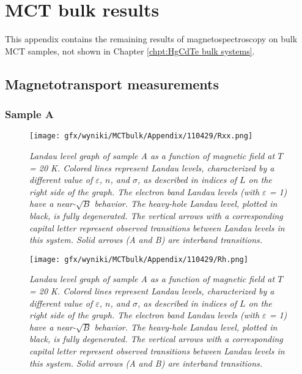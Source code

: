 \documentclass[titlepage,a4paper]{book}
\newcommand{\wciecie}{\quad\phantom{v}}
\begin{document}

\chapter{MCT bulk results}
\label{Appendix_bulk}
\wciecie
This appendix contains the remaining results of magnetospectroscopy on bulk MCT samples, not shown in Chapter \ref{chpt:HgCdTe bulk systems}.

\section{Magnetotransport measurements}
\subsection{Sample A}
\begin{figure}[ht]
	\centering
	\texttt{[image: gfx/wyniki/MCTbulk/Appendix/110429/Rxx.png]}
	\vspace{-10pt}
	\caption{\textit{Landau level graph of sample A as a function of magnetic field at $T$ = 20 K. Colored lines represent Landau levels, characterized by a different value of $\varepsilon$, $n$, and $\sigma$, as described in indices of $L$ on the right side of the graph. The electron band Landau levels (with $\varepsilon$ = 1) have a near-$\sqrt{B}$ behavior. The heavy-hole Landau level, plotted in black, is fully degenerated. The vertical arrows with a corresponding capital letter represent observed transitions between Landau levels in this system. Solid arrows (A and B) are interband transitions.}}
	\label{fig:110429_Rxx}
\end{figure}
\begin{figure}[ht]
	\centering
	\texttt{[image: gfx/wyniki/MCTbulk/Appendix/110429/Rh.png]}
	\vspace{-10pt}
	\caption{\textit{Landau level graph of sample A as a function of magnetic field at $T$ = 20 K. Colored lines represent Landau levels, characterized by a different value of $\varepsilon$, $n$, and $\sigma$, as described in indices of $L$ on the right side of the graph. The electron band Landau levels (with $\varepsilon$ = 1) have a near-$\sqrt{B}$ behavior. The heavy-hole Landau level, plotted in black, is fully degenerated. The vertical arrows with a corresponding capital letter represent observed transitions between Landau levels in this system. Solid arrows (A and B) are interband transitions.}}
	\label{fig:110429_Rh}
\end{figure}
\end{document}
